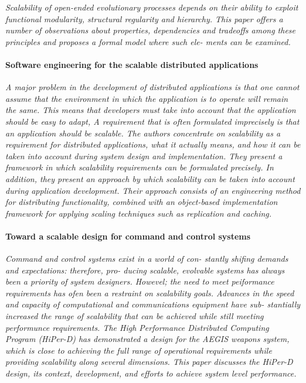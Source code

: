 \documentclass{article}
\begin{document}
{\emph{Scalability of open-ended evolutionary processes depends on their ability
to exploit functional modularity, structural regularity and hierarchy.  This
paper offers a number of observations about properties, dependencies and
tradeoffs among these principles and proposes a formal model where such ele-
ments can be examined.}

\paragraph{Software engineering for the scalable distributed applications}
\cite{van1998software}

\emph{A major problem in the development of distributed applications is that
one cannot assume that the environment in which the application is to operate
will remain the same. This means that developers must take into account that
the application should be easy to adapt, A requirement that is often formulated
imprecisely is that an application should be scalable. The authors concentrate
on scalability as a requirement for distributed applications, what it actually
means, and how it can be taken into account during system design and
implementation. They present a framework in which scalability requirements can
be formulated precisely. In addition, they present an approach by which
scalability can be taken into account during application development. Their
approach consists of an engineering method for distributing functionality,
combined with an object-based implementation framework for applying scaling
techniques such as replication and caching.}

\paragraph{Toward a scalable design for command and control systems}
\cite{caruso1997toward}

\emph{ Command and control systems exist in a world of con- stantly shifing
demands and expectations: therefore, pro- ducing scalable, evolvable systems
has always been a priority of system designers. Howevel; the need to meet
peiformance requirements has ofen been a restraint on scalability goals.
Advances in the speed and capacity of computational and communications
equipment have sub- stantially increased the range of scalability that can be
achieved while still meeting performunce requirements.  The High Performance
Distributed Computing Program (HiPer-D) has demonstrated a design for the AEGIS
weapons system, which is close to achieving the full range of operational
requirements while providing scalability along several dimensions. This paper
discusses the HiPer-D design, its context, development, and efforts to achieve
system level performance.}

}
\end{document}
